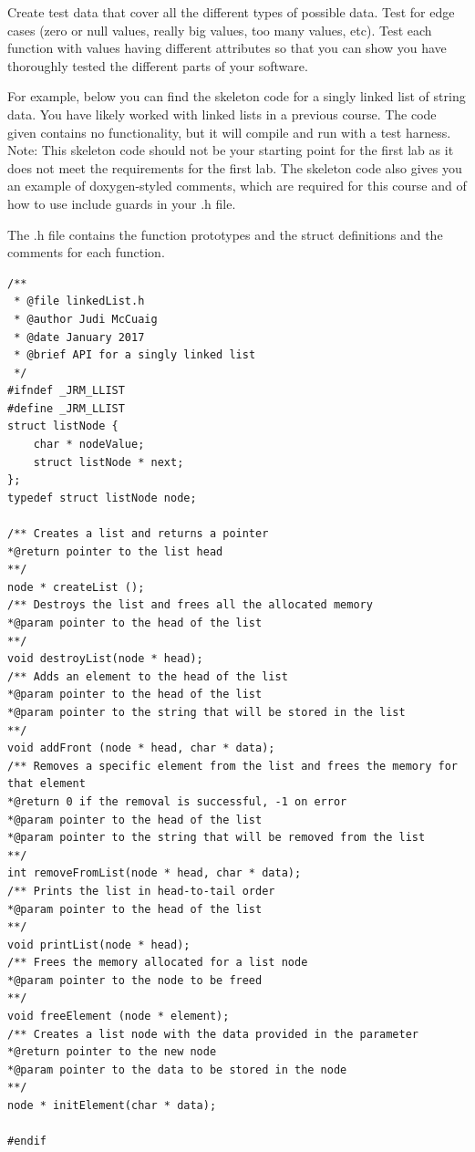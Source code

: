 Create test data that cover all the different types of possible data.   Test for edge cases (zero or null values,   really big values, too many values, etc).   Test each function with  values having different attributes so that you can show you have thoroughly tested the different parts of your software.

For example,  below you can find  the skeleton code for a singly linked list of string data.  You have likely worked with linked lists in a previous course.  The code given contains no functionality, but it will compile and run with a test harness.    Note:  This skeleton code should not be your starting point for the first lab as it does not meet the requirements for the first lab.   The skeleton code also gives you an example of doxygen-styled comments, which are required for this course and of how to use include guards in your .h file.


The .h file contains the function prototypes and the struct definitions and  the comments for each function.
\begin{lstlisting}
/**
 * @file linkedList.h
 * @author Judi McCuaig
 * @date January 2017
 * @brief API for a singly linked list
 */
#ifndef _JRM_LLIST
#define _JRM_LLIST
struct listNode {
    char * nodeValue;
    struct listNode * next;
};
typedef struct listNode node;

/** Creates a list and returns a pointer
*@return pointer to the list head
**/
node * createList ();
/** Destroys the list and frees all the allocated memory
*@param pointer to the head of the list
**/
void destroyList(node * head);
/** Adds an element to the head of the list
*@param pointer to the head of the list
*@param pointer to the string that will be stored in the list
**/
void addFront (node * head, char * data);
/** Removes a specific element from the list and frees the memory for that element
*@return 0 if the removal is successful, -1 on error
*@param pointer to the head of the list
*@param pointer to the string that will be removed from the list
**/
int removeFromList(node * head, char * data);
/** Prints the list in head-to-tail order
*@param pointer to the head of the list
**/
void printList(node * head);
/** Frees the memory allocated for a list node
*@param pointer to the node to be freed
**/
void freeElement (node * element);
/** Creates a list node with the data provided in the parameter
*@return pointer to the new node
*@param pointer to the data to be stored in the node
**/
node * initElement(char * data);

#endif
\end{lstlisting}

